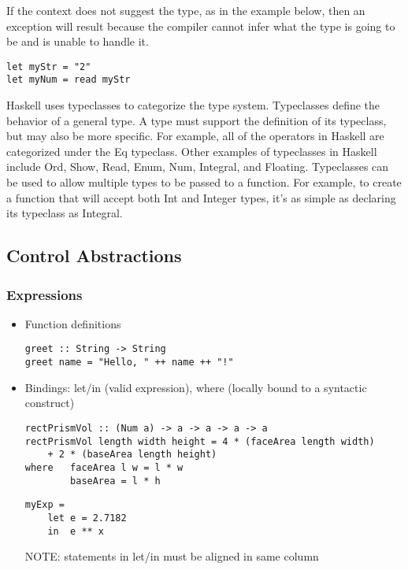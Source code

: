 \documentclass[titlepage,12pt]{article}
\newcommand{\bi}{\begin{itemize}}
\newcommand{\ei}{\end{itemize}}
\begin{document}
If the context does not suggest the type, as in the example below, then an exception will result because the compiler cannot infer what the type is going to be and is unable to handle it. 

\begin{verbatim}
let myStr = "2" 
let myNum = read myStr
\end{verbatim}

Haskell uses typeclasses to categorize the type system. Typeclasses define the behavior of a general type. A type must support the definition of its typeclass, but may also be more specific. For example, all of the operators in Haskell are categorized under the Eq typeclass. Other examples of typeclasses in Haskell include Ord, Show, Read, Enum, Num, Integral, and Floating. Typeclasses can be used to allow multiple types to be passed to a function. For example, to create a function that will accept both Int and Integer types, it's as simple as declaring its typeclass as Integral.

\subsection{Control Abstractions}
\subsubsection{Expressions}
\bi
    \item Function definitions
\begin{verbatim}
greet :: String -> String
greet name = "Hello, " ++ name ++ "!"
\end{verbatim}
    \item Bindings: let/in (valid expression), where (locally bound to a syntactic construct)
\begin{verbatim}
rectPrismVol :: (Num a) -> a -> a -> a -> a
rectPrismVol length width height = 4 * (faceArea length width)
    + 2 * (baseArea length height)
where   faceArea l w = l * w
        baseArea = l * h
\end{verbatim}
\begin{verbatim}
myExp =
    let e = 2.7182
    in  e ** x
\end{verbatim}
NOTE: statements in let/in must be aligned in same column
\ei
\end{document}
